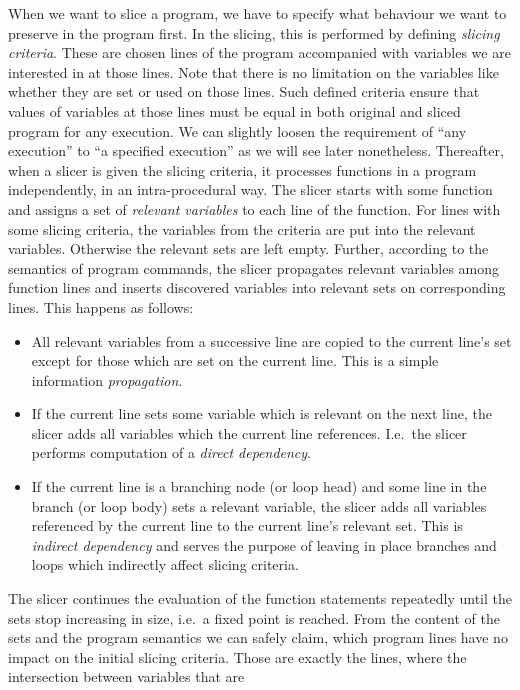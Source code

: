 When we want to slice a program, we have to specify what behaviour we want to
preserve in the program first. In the slicing, this is performed by defining
\emph{slicing criteria}. These are chosen lines of the program accompanied
with variables we are interested in at those lines. Note that there is no
limitation on the variables like whether they are set or used on those lines.
Such defined criteria ensure that values of variables at those lines must be
equal in both original and sliced program for any execution. We can slightly
loosen the requirement of ``any execution'' to ``a specified execution'' as we
will see later nonetheless.  Thereafter, when a slicer is given the slicing
criteria, it processes functions in a program independently, in an
intra-procedural way. The slicer starts with some function and assigns a set
of \emph{relevant variables} to each line of the function. For lines with
some slicing criteria, the variables from the criteria are put into the
relevant variables. Otherwise the relevant sets are left empty.  Further,
according to the semantics of program commands, the slicer propagates relevant
variables among function lines and inserts discovered variables into relevant
sets on corresponding lines. This happens as follows:
\begin{itemize}
\item All relevant variables from a successive line are copied to the current
line's set except for those which are set on the current line. This is a
simple information \emph{propagation}.
\item If the current line sets some variable which is relevant on the next
line, the slicer adds all variables which the current line references.  I.e.\
the slicer performs computation of a \emph{direct dependency}.
\item If the current line is a branching node (or loop head) and some line in
the branch (or loop body) sets a relevant variable, the slicer adds all
variables referenced by the current line to the current line's relevant set.
This is \emph{indirect dependency} and serves the purpose of leaving in place
branches and loops which indirectly affect slicing criteria.
\end{itemize}
The slicer continues the evaluation of the function statements repeatedly
until the sets stop increasing in size, i.e.\ a fixed point is reached.  From
the content of the sets and the program semantics we can safely claim, which
program lines have no impact on the initial slicing criteria.
Those are exactly the lines, where the intersection between variables that are
